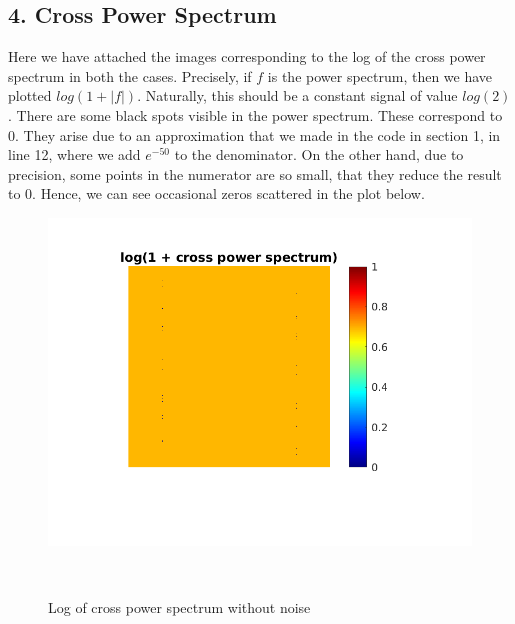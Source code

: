 \documentclass[12pt, a4paper]{article}
\begin{document}
\subsection*{4. Cross Power Spectrum}
Here we have attached the images corresponding to the log of the cross power spectrum in both the cases. Precisely, if $f$ is the power spectrum, then we have plotted $log(1+ |f|)$. Naturally, this should be a constant signal of value $log(2)$. There are some black spots visible in the power spectrum. These correspond to 0. They arise due to an approximation that we made in the code in section 1, in line 12, where we add $e^{-50}$ to the denominator. On the other hand, due to precision, some points in the numerator are so small, that they reduce the result to 0. Hence, we can see occasional zeros scattered in the plot below.
\begin{figure}[h!]
    \centering
    \renewcommand{\thefigure}{5.3 (a)}
    \begin{minipage}[c][1\width]{0.6\textwidth}
    	\includegraphics[width=1\textwidth]{log_fft_noiseless.png}
    	\vspace*{-60pt}
    	\caption{Log of cross power spectrum without noise}
	    \label{fig:5.3.a}
    \end{minipage} \\
    \vspace*{-60pt}
    \renewcommand{\thefigure}{5.3 (b)}
    \begin{minipage}[c][1\width]{0.6\textwidth}

\end{minipage}
\end{figure}
\end{document}
